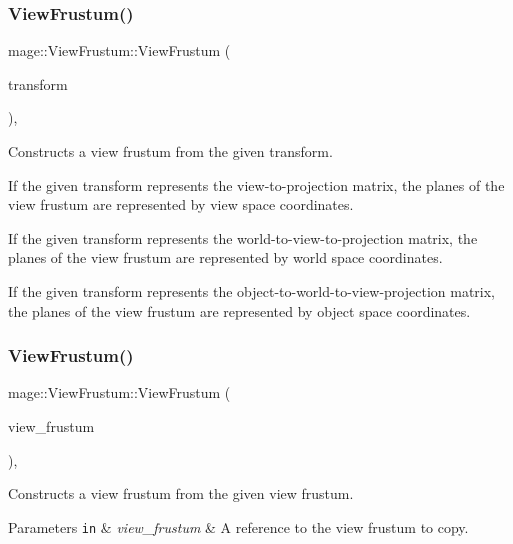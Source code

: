 \subsubsection{\texorpdfstring{View\+Frustum()}{ViewFrustum()}\hspace{0.1cm}{\footnotesize\ttfamily [1/3]}}
{\footnotesize\ttfamily mage\+::\+View\+Frustum\+::\+View\+Frustum (\begin{DoxyParamCaption}\item[{C\+X\+M\+M\+A\+T\+R\+IX}]{transform }\end{DoxyParamCaption})\hspace{0.3cm}{\ttfamily [explicit]}, {\ttfamily [noexcept]}}

Constructs a view frustum from the given transform.

If the given transform represents the view-\/to-\/projection matrix, the planes of the view frustum are represented by view space coordinates.

If the given transform represents the world-\/to-\/view-\/to-\/projection matrix, the planes of the view frustum are represented by world space coordinates.

If the given transform represents the object-\/to-\/world-\/to-\/view-\/projection matrix, the planes of the view frustum are represented by object space coordinates. \hypertarget{structmage_1_1_view_frustum_a1c8ce91aa113c84ae76bcce818bf8cb3}{}\label{structmage_1_1_view_frustum_a1c8ce91aa113c84ae76bcce818bf8cb3} 
\subsubsection{\texorpdfstring{View\+Frustum()}{ViewFrustum()}\hspace{0.1cm}{\footnotesize\ttfamily [2/3]}}
{\footnotesize\ttfamily mage\+::\+View\+Frustum\+::\+View\+Frustum (\begin{DoxyParamCaption}\item[{const \hyperlink{structmage_1_1_view_frustum}{View\+Frustum} \&}]{view\+\_\+frustum }\end{DoxyParamCaption})\hspace{0.3cm}{\ttfamily [default]}, {\ttfamily [noexcept]}}

Constructs a view frustum from the given view frustum.


\begin{DoxyParams}[1]{Parameters}
\mbox{\tt in}  & {\em view\+\_\+frustum} & A reference to the view frustum to copy. \\
\hline
\end{DoxyParams}
\hypertarget{structmage_1_1_view_frustum_a03781189c576035b6cafa0bc7789e39f}{}\label{structmage_1_1_view_frustum_a03781189c576035b6cafa0bc7789e39f} 
